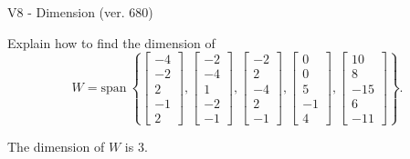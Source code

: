 \begin{exercise}
  \begin{exerciseTitle}V8 - Dimension (ver. 680)\end{exerciseTitle}
  \begin{exerciseStatement}
    Explain how to find the dimension of 
\[W=\mathrm{span}\ \left\{\left[\begin{array}{r}
-4 \\
-2 \\
2 \\
-1 \\
2
\end{array}\right] , \left[\begin{array}{r}
-2 \\
-4 \\
1 \\
-2 \\
-1
\end{array}\right] , \left[\begin{array}{r}
-2 \\
2 \\
-4 \\
2 \\
-1
\end{array}\right] , \left[\begin{array}{r}
0 \\
0 \\
5 \\
-1 \\
4
\end{array}\right] , \left[\begin{array}{r}
10 \\
8 \\
-15 \\
6 \\
-11
\end{array}\right]\right\}.\]



  \end{exerciseStatement}
  \begin{exerciseAnswer}
   The dimension of \(W\) is  \(3\).
  


  \end{exerciseAnswer}
\end{exercise}
